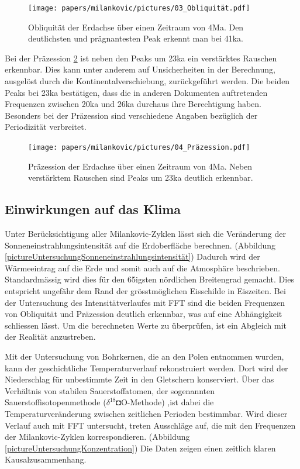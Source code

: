 \begin{figure}
	\centering
	\texttt{[image: papers/milankovic/pictures/03\_Obliquität.pdf]}
	\caption{Obliquität der Erdachse  über einen Zeitraum von 4Ma. 
	Den deutlichsten und prägnantesten Peak erkennt man bei 41ka.  
		\label{pictureUntersuchungObliquität}}
\end{figure}

Bei der Präzession
\ref{pictureUntersuchungPräzession}
ist neben den Peaks um 23ka ein verstärktes Rauschen erkennbar.
Dies kann unter anderem auf Unsicherheiten in der Berechnung, ausgelöst durch die Kontinentalverschiebung, zurückgeführt werden.
Die beiden Peaks bei 23ka bestätigen, dass die in anderen Dokumenten auftretenden Frequenzen zwischen 20ka und 26ka durchaus ihre Berechtigung haben.
Besonders bei der Präzession sind verschiedene Angaben bezüglich der Periodizität verbreitet.


\begin{figure}
	\centering
	\texttt{[image: papers/milankovic/pictures/04\_Präzession.pdf]}
	\caption{Präzession der Erdachse über einen Zeitraum von 4Ma.
	Neben verstärktem Rauschen sind Peaks um 23ka deutlich erkennbar.
		\label{pictureUntersuchungPräzession}}
\end{figure}

\subsection{Einwirkungen auf das Klima
\label{milankovic:subsection:EinwirkungenKlima}}
Unter Berücksichtigung aller Milankovic-Zyklen lässt sich die Veränderung der Sonneneinstrahlungsintensität auf die Erdoberfläche berechnen.
(Abbildung \ref{pictureUntersuchungSonneneinstrahlungsintensität})
Dadurch wird der Wärmeeintrag auf die Erde und somit auch auf die Atmosphäre beschrieben. Standardmässig wird dies für den 65igsten nördlichen Breitengrad gemacht.
Dies entspricht ungefähr dem Rand der grösstmöglichen Eisschilde in Eiszeiten.
Bei der Untersuchung des Intensitätverlaufes mit FFT sind die beiden Frequenzen von Obliquität und Präzession deutlich erkennbar, was auf eine Abhängigkeit schliessen lässt.
Um die berechneten Werte zu überprüfen, ist ein Abgleich mit der Realität anzustreben.

Mit der Untersuchung von Bohrkernen, die an den Polen entnommen wurden, kann der geschichtliche Temperaturverlauf rekonstruiert werden.
Dort wird der Niederschlag für unbestimmte Zeit in den Gletschern konserviert. Über das Verhältnis von stabilen Sauerstoffatomen, der sogenannten Sauerstoffisotopenmethode ($\delta^{18}◘\text{O}$-Methode)
,ist dabei die Temperaturveränderung zwischen zeitlichen Perioden bestimmbar.
Wird dieser Verlauf auch mit FFT untersucht, treten Ausschläge auf, die mit den Frequenzen der Milankovic-Zyklen korrespondieren.
(Abbildung \ref{pictureUntersuchungKonzentration})
Die Daten zeigen einen zeitlich klaren Kausalzusammenhang.

